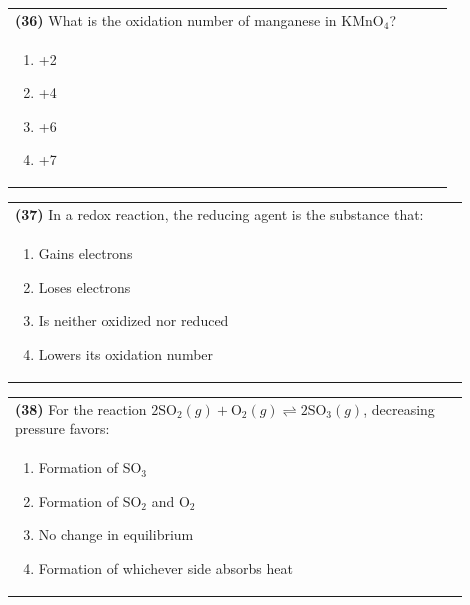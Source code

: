 \documentclass{article}
\begin{document}
\noindent\begin{tabular}{|p{0.9\linewidth}|}
\hline
\textbf{(36)} What is the oxidation number of manganese in KMnO$_4$?\\[0.2cm]
\begin{minipage}[t]{0.85\linewidth}
\begin{enumerate}[label=\alph*.]
\item +2
\item +4
\item +6
\item +7
\end{enumerate}
\end{minipage}\\[0.2cm]
\hline
\end{tabular}
\newpage

\noindent\begin{tabular}{|p{0.9\linewidth}|}
\hline
\textbf{(37)} In a redox reaction, the reducing agent is the substance that:\\[0.2cm]
\begin{minipage}[t]{0.85\linewidth}
\begin{enumerate}[label=\alph*.]
\item Gains electrons
\item Loses electrons
\item Is neither oxidized nor reduced
\item Lowers its oxidation number
\end{enumerate}
\end{minipage}\\[0.2cm]
\hline
\end{tabular}

\noindent\begin{tabular}{|p{0.9\linewidth}|}
\hline
\textbf{(38)} For the reaction $2\text{SO}_2(g) + \text{O}_2(g) \rightleftharpoons 2\text{SO}_3(g)$, decreasing pressure favors: \\[0.2cm]
\begin{minipage}[t]{0.85\linewidth}
\begin{enumerate}[label=\alph*.]
\item Formation of SO$_3$
\item Formation of SO$_2$ and O$_2$
\item No change in equilibrium
\item Formation of whichever side absorbs heat
\end{enumerate}
\end{minipage}\\[0.2cm]
\hline
\end{tabular}
\end{document}
